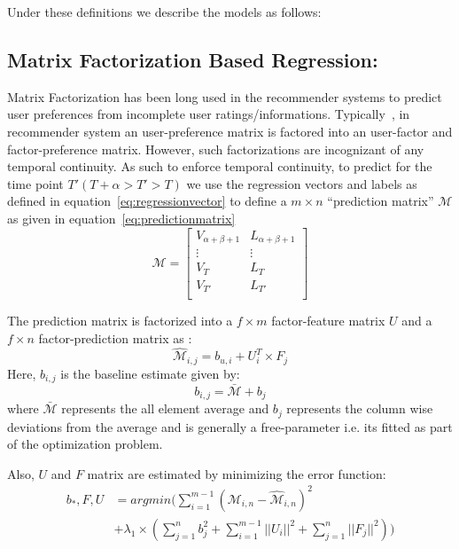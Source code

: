 Under these definitions we describe the models as follows:
\subsection{\label{sec:model:matrixfactor} Matrix Factorization Based Regression:}
Matrix Factorization has been long used in the recommender systems to predict user 
preferences from incomplete user ratings/informations. Typically~\cite{canny2002factor},
in recommender system an user-preference matrix is factored into an user-factor and
factor-preference matrix. However, such factorizations are incognizant of any 
temporal continuity. As such to enforce temporal continuity, to predict for the time point 
$T' (T +\alpha > T' > T)$ we use the regression vectors 
and labels as defined in equation~\ref{eq:regressionvector} to define a $m \times n$ ``prediction
matrix'' $\mathcal{M}$ as given in equation~\ref{eq:predictionmatrix} 
\begin{equation}
  \label{eq:predictionmatrix}
\mathcal{M} = \left[\begin{array}{ll}
              V_{\alpha + \beta + 1} & L_{\alpha+\beta + 1} \\
                              \vdots & \vdots \\
                               V_{T} & L_T \\
                               V_{T'} & L_{T'} \\ 
    \end{array}
  \right]
\end{equation}

The prediction matrix is factorized into a $f\times m$ factor-feature matrix $U$ and 
a $f\times n$ factor-prediction matrix as :
\[ \widehat{\mathcal{M}}_{i,j} = b_{u,i} + U^T_i \times F_j\]
Here, $b_{i,j}$ is the baseline estimate given by:
 \begin{equation}
   \label{eq:baseline}
   b_{i,j} = \bar{\mathcal{M}} + b_j 
 \end{equation}
 where $\bar{\mathcal{M}}$ represents the all element average and $b_j$ represents 
 the column wise deviations from the average and is generally a free-parameter i.e.
 its fitted as part of the optimization problem.

 Also, $U$ and $F$ matrix are estimated by minimizing the error function:
\begin{equation}
  \begin{array}{ll}
  \label{eq:matrix:fit}
  b_*, F, U  & =  argmin (\sum \limits_{i=1}^{m-1} \left(\mathcal{M}_{i,n}  - \widehat{\mathcal{M}}_{i,n} \right)^2 \\ 
  & + \lambda_1\times(\sum \limits_{j=1}^{n}b_j^2 + \sum \limits_{i=1}^{m-1} || U_i||^2 + \sum \limits_{j=1}^{n} || F_j||^2))
\end{array}
\end{equation}

